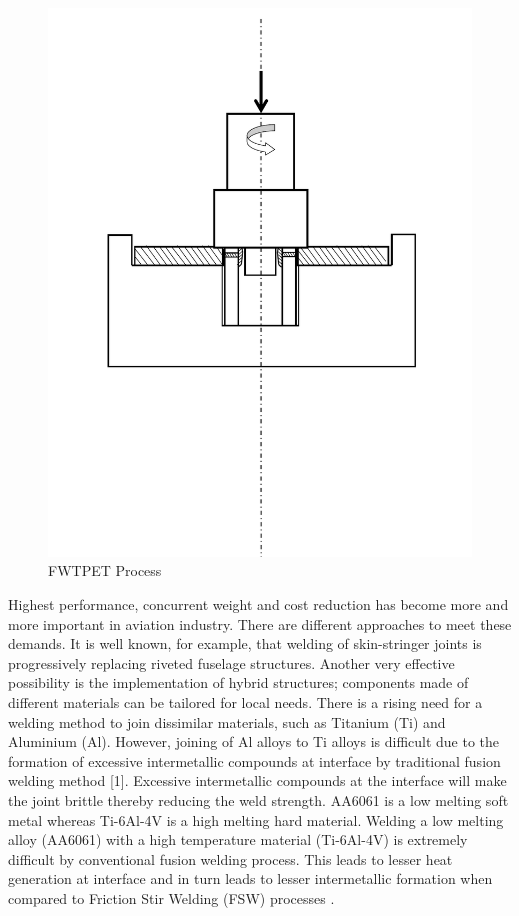 \documentclass[3p]{elsarticle}
\begin{document}
\begin{figure}[h!]
\centering
\includegraphics[trim=1cm 2cm 3cm 4cm, scale=0.1,width=\textwidth]{images/welding set up.pdf}
\caption{FWTPET Process}
\label{fig:fwtpet-process}
\end{figure}
\par 
Highest performance, concurrent weight and cost reduction has become more and more important in aviation industry. There are different approaches to meet these demands. It is well known, for example, that welding of skin-stringer joints is progressively replacing riveted fuselage structures. Another very effective possibility is the implementation of hybrid structures; components made of different materials can be tailored for local needs. There is a rising need for a welding method to join dissimilar materials, such as Titanium (Ti) and Aluminium (Al). However, joining of Al alloys to Ti alloys is difficult due to the formation of excessive intermetallic compounds at interface by traditional fusion welding method [1]. Excessive intermetallic compounds at the interface will make the joint brittle thereby reducing the weld strength. AA6061 is a low melting soft metal whereas Ti-6Al-4V is a high melting hard material. Welding a low melting alloy (AA6061) with a high temperature material (Ti-6Al-4V) is extremely difficult by conventional fusion welding process. This leads to lesser heat generation at interface and in turn leads to lesser intermetallic formation when compared to Friction Stir Welding (FSW) processes \cite{MadhusudhanReddy2009}.
\end{document}

